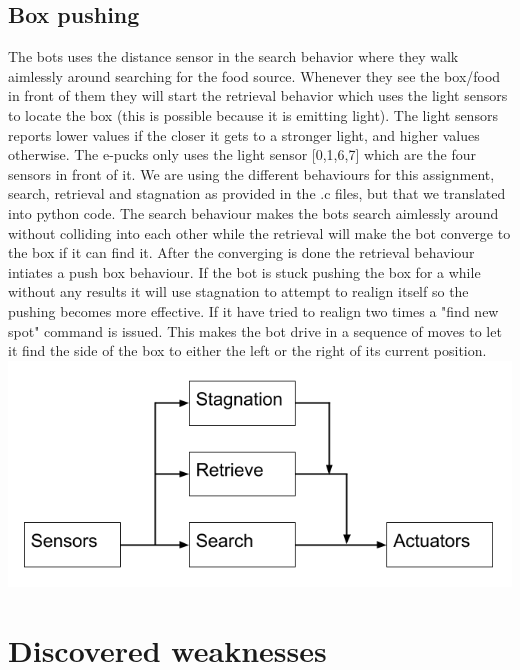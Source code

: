 \documentclass[12pt, a4paper]{article}
\begin{document}
\subsection{Box pushing}
The bots uses the distance sensor in the search behavior where they walk aimlessly around searching for the food source. Whenever they see the box/food in front of them they will start the retrieval behavior which uses the light sensors to locate the box (this is possible because it is emitting light). The light sensors reports lower values if the closer it gets to a stronger light, and higher values otherwise.
The e-pucks only uses the light sensor [0,1,6,7] which are the four sensors in front of it. We are using the different behaviours for this assignment, search, retrieval and stagnation as provided in the .c files, but that we translated into python code. 
The search behaviour makes the bots search aimlessly around without colliding into each other while the retrieval will make the bot converge to the box if it can find it. After the converging is done the retrieval behaviour intiates a push box behaviour. If the bot is stuck pushing the box for a while without any results it will use stagnation to attempt to realign itself so the pushing becomes more effective. If it have tried to realign two times a "find new spot" command is issued. This makes the bot drive in a sequence of moves to let it find the side of the box to either the left or the right of its current position.
\includegraphics[width=15cm]{Brooks-lite.png}


\section{Discovered weaknesses}
\end{document}
